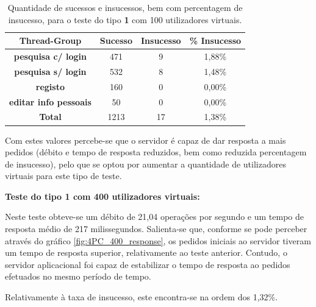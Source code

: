 \begin{table}[H]
\centering
\caption{Quantidade de sucessos e insucessos, bem com percentagem de insucesso, para o teste do tipo \textbf{1} com 100 utilizadores virtuais.}
\begin{tabular}{cccc}
\hline
\rowcolor[HTML]{EFEFEF} 
\textbf{Thread-Group}                  & \textbf{Sucesso} & \textbf{Insucesso} & \textbf{\% Insucesso} \\ \hline
\textbf{pesquisa c/ login}             & 471              & 9                  & 1,88\%                \\
\textbf{pesquisa s/ login}             & 532              & 8                  & 1,48\%                \\
\textbf{registo}                       & 160              & 0                  & 0,00\%                \\
\textbf{editar info pessoais}          & 50               & 0                  & 0,00\%                \\ \hline
\cellcolor[HTML]{EFEFEF}\textbf{Total} & 1213             & 17                 & 1,38\%                \\ \hline
\end{tabular}
\end{table}

Com estes valores percebe-se que o servidor é capaz de dar resposta a mais pedidos (débito e tempo de resposta reduzidos, bem como reduzida percentagem de insucesso), pelo que se optou por aumentar a quantidade de utilizadores virtuais para este tipo de teste. 

\vspace{0.5cm}
\noindent\textbf{Teste do tipo 1 com 400 utilizadores virtuais:}

Neste teste obteve-se um débito de 21,04 operações por segundo e um tempo de resposta médio de 217 milissegundos. Salienta-se que, conforme se pode perceber através do gráfico \ref{fig:4PC_400_response}, os pedidos iniciais ao servidor tiveram um tempo de resposta superior, relativamente ao teste anterior. Contudo, o servidor aplicacional foi capaz de estabilizar o tempo de resposta ao pedidos efetuados no mesmo período de tempo.

Relativamente à taxa de insucesso, este encontra-se na ordem dos 1,32\%.

